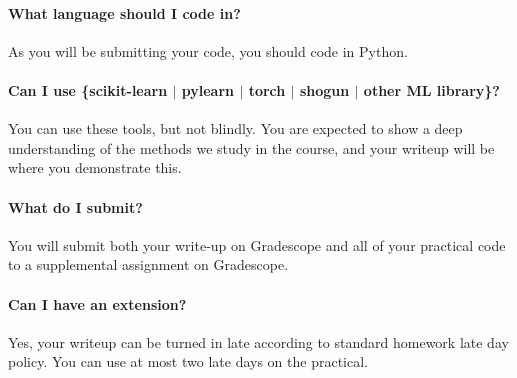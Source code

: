 \documentclass[12pt]{article}
\begin{document}
\paragraph{What language should I code in?}
As you will be submitting your code, you should code in Python.

\paragraph{Can I use \{scikit-learn $|$ pylearn $|$ torch $|$ shogun $|$ other ML library\}?}
You can use these tools, but not blindly.  You are expected to show a
deep understanding of the methods we study in the course, and your
writeup will be where you demonstrate this.

\paragraph{What do I submit?}
You will submit both your write-up on Gradescope and all of your practical code to a supplemental assignment on Gradescope.

\paragraph{Can I have an extension?}
Yes, your writeup can be turned in late according to standard homework late day policy.  You can use at most two late days on the practical.
\end{document}
